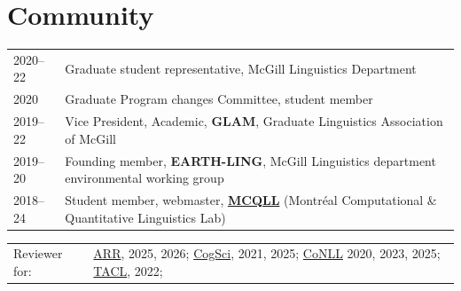 \documentclass[11pt,a4paper]{article}
\begin{document}
  \section{Community}
  \begin{longtable}{p{1.7cm}|p{15cm}}
    \textsc{2020--22}
    &%
    Graduate student representative, McGill Linguistics Department\\
    \textsc{2020}
    &%
    Graduate Program changes Committee, student member\\
    \textsc{2019--22}
    &%
    Vice President, Academic, \textbf{GLAM}, Graduate Linguistics Association of
    McGill\\
    \textsc{2019--20}&%
    Founding member, \textbf{EARTH-LING}, McGill Linguistics department
    environmental working group\\
    \textsc{2018--24}
    &%
    Student member, webmaster, \href{http://mcqll.org}{\textbf{MCQLL}} (Montréal Computational \& Quantitative
    Linguistics Lab)\\
  \end{longtable}
  \begin{longtable}[l]{ll}
    Reviewer for:
    &%
    \href{https://aclrollingreview.org/}{ARR}, 2025, 2026;
    \href{https://cognitivesciencesociety.org/}{CogSci}, 2021, 2025;
    \href{https://www.conll.org/}{CoNLL} 2020, 2023, 2025;
    \href{https://transacl.org/}{TACL}, 2022;
  \end{longtable}

\end{document}
